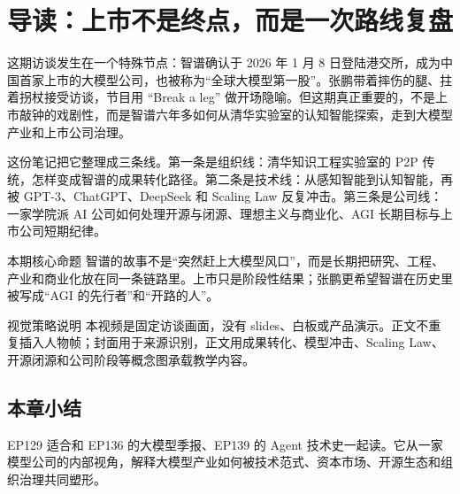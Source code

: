 \section{导读：上市不是终点，而是一次路线复盘}

这期访谈发生在一个特殊节点：智谱确认于 2026 年 1 月 8 日登陆港交所，成为中国首家上市的大模型公司，也被称为“全球大模型第一股”。张鹏带着摔伤的腿、拄着拐杖接受访谈，节目用 “Break a leg” 做开场隐喻。但这期真正重要的，不是上市敲钟的戏剧性，而是智谱六年多如何从清华实验室的认知智能探索，走到大模型产业和上市公司治理。

这份笔记把它整理成三条线。第一条是组织线：清华知识工程实验室的 P2P 传统，怎样变成智谱的成果转化路径。第二条是技术线：从感知智能到认知智能，再被 GPT-3、ChatGPT、DeepSeek 和 Scaling Law 反复冲击。第三条是公司线：一家学院派 AI 公司如何处理开源与闭源、理想主义与商业化、AGI 长期目标与上市公司短期纪律。

\begin{importantbox}{本期核心命题}
智谱的故事不是“突然赶上大模型风口”，而是长期把研究、工程、产业和商业化放在同一条链路里。上市只是阶段性结果；张鹏更希望智谱在历史里被写成“AGI 的先行者”和“开路的人”。
\end{importantbox}

\begin{knowledgebox}{视觉策略说明}
本视频是固定访谈画面，没有 slides、白板或产品演示。正文不重复插入人物帧；封面用于来源识别，正文用成果转化、模型冲击、Scaling Law、开源闭源和公司阶段等概念图承载教学内容。
\end{knowledgebox}

\subsection{本章小结}

EP129 适合和 EP136 的大模型季报、EP139 的 Agent 技术史一起读。它从一家模型公司的内部视角，解释大模型产业如何被技术范式、资本市场、开源生态和组织治理共同塑形。

